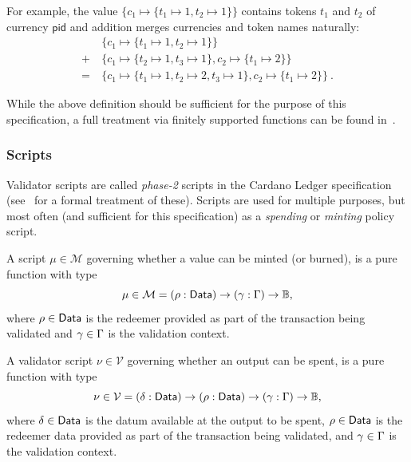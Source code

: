 For example, the value $\{c_{1} \mapsto \{t_1 \mapsto 1, t_2 \mapsto 1\}\}$
contains tokens $t_1$ and $t_2$ of currency $\mathsf{pid}$ and addition merges currencies
and token names naturally:
\begin{align*}
	     & \{c_{1} \mapsto \{t_1 \mapsto 1, t_2 \mapsto 1\}\}                                                        \\
	+ \  & \{c_{1} \mapsto \{t_{2} \mapsto 1, t_3 \mapsto 1\}, c_{2} \mapsto \{ t_{1} \mapsto 2\}\}                  \\
	= \  & \{c_{1} \mapsto \{t_1 \mapsto 1, t_2 \mapsto 2, t_3 \mapsto 1\}, c_{2} \mapsto \{ t_{1} \mapsto 2\}\} \ .
\end{align*}

While the above definition should be sufficient for the purpose of this
specification, a full treatment via finitely supported functions can be found
in~\cite{utxo-ma}.

\subsubsection{Scripts}

Validator scripts are called \emph{phase-2} scripts in the Cardano Ledger
specification (see~\cite{ledger-alonzo-spec} for a formal treatment of these). Scripts
are used for multiple purposes, but most often (and sufficient for this
specification) as a \emph{spending} or \emph{minting} policy script.

\begin{definition}
	A script $\mu \in \mathcal{M}$ governing whether a value can be minted (or
	burned), is a pure function with type
	\[
		\mu \in \mathcal{M} = (\rho : \mathsf{Data}) \to (\gamma : \Gamma) \to\mathbb{B},
	\]
	where $\rho \in \mathsf{Data}$ is the redeemer provided as part of the transaction
	being validated and $\gamma \in \Gamma$ is the validation
	context.
\end{definition}

\begin{definition}
	A validator script $\nu \in \mathcal{V}$ governing whether an output can be
	spent, is a pure function with type
	\[
		\nu \in \mathcal{V} = (\delta : \mathsf{Data}) \to (\rho : \mathsf{Data}) \to (\gamma : \Gamma) \to\mathbb{B},
	\]
	where $\delta \in \mathsf{Data}$ is the datum available at the output to be spent,
	$\rho \in \mathsf{Data}$ is the redeemer data provided as part of the transaction
	being validated, and $\gamma \in \Gamma$ is the validation
	context.
\end{definition}


